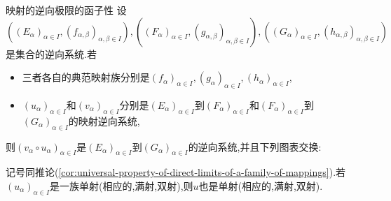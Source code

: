 \begin{corollary}{映射的逆向极限的函子性}{}
	设$\left(\left(E_{\alpha}\right)_{\alpha\in I},\left(f_{\alpha,\beta}\right)_{\alpha,\beta\in I}\right),\left(\left(F_{\alpha}\right)_{\alpha\in I},\left(g_{\alpha,\beta}\right)_{\alpha,\beta\in I}\right),\left(\left(G_{\alpha}\right)_{\alpha\in I},\left(h_{\alpha,\beta}\right)_{\alpha,\beta\in I}\right)$是集合的逆向系统.若
	\begin{itemize}
		\item 三者各自的典范映射族分别是$\left(f_{\alpha}\right)_{\alpha\in I},\left(g_{\alpha}\right)_{\alpha\in I},\left(h_{\alpha}\right)_{\alpha\in I}$,
		\item $\left(u_{\alpha}\right)_{\alpha\in I}$和$\left(v_{\alpha}\right)_{\alpha\in I}$分别是$\left(E_{\alpha}\right)_{\alpha\in I}$到$\left(F_{\alpha}\right)_{\alpha\in I}$和$\left(F_{\alpha}\right)_{\alpha\in I}$到$\left(G_{\alpha}\right)_{\alpha\in I}$的映射逆向系统,
	\end{itemize}
	则$\left(v_{\alpha}\circ u_{\alpha}\right)_{\alpha\in I}$是$\left(E_{\alpha}\right)_{\alpha\in I}$到$\left(G_{\alpha}\right)_{\alpha\in I}$的逆向系统,并且下列图表交换:
	\begin{center}
	\end{center}
\end{corollary}

\begin{corollary}{}{}
	记号同推论(\cref{cor:universal-property-of-direct-limits-of-a-family-of-mappings}).若$\left(u_{\alpha}\right)_{\alpha\in I}$是一族单射(相应的,满射,双射),则$u$也是单射(相应的,满射,双射).
\end{corollary}

